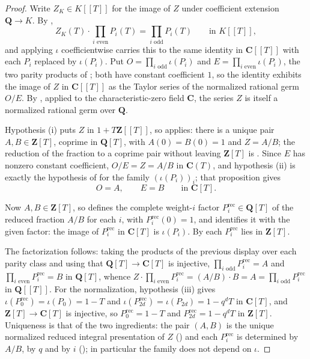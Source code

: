 \begin{proof}
\leanok
Write $Z_K\in K[[T]]$ for the image of $Z$ under coefficient extension
$\mathbf Q\to K$.  By ,
\[
  Z_K(T)\cdot\prod_{i\text{ even}}P_i(T)=\prod_{i\text{ odd}}P_i(T)
  \qquad\text{in }K[[T]],
\]
and applying $\iota$ coefficientwise carries this to the same identity in
$\mathbf C[[T]]$ with each $P_i$ replaced by $\iota(P_i)$.  Put
$O=\prod_{i\text{ odd}}\iota(P_i)$ and $E=\prod_{i\text{ even}}\iota(P_i)$,
the two parity products of ; both have constant
coefficient $1$, so the identity exhibits the image of $Z$ in
$\mathbf C[[T]]$ as the Taylor series of the normalized rational germ $O/E$.
By , applied to the
characteristic-zero field $\mathbf C$, the series $Z$ is itself a normalized
rational germ over $\mathbf Q$.

Hypothesis (i) puts $Z$ in $1+T\mathbf Z[[T]]$, so
 applies: there is a unique pair
$A,B\in\mathbf Z[T]$, coprime in $\mathbf Q[T]$, with
$A(0)=B(0)=1$ and $Z=A/B$; the reduction of the fraction to a coprime pair
without leaving $\mathbf Z[T]$ is
.  Since $E$ has nonzero constant
coefficient, $O/E=Z=A/B$ in $\mathbf C(T)$, and hypothesis (ii) is exactly the
hypothesis of  for the family
$(\iota(P_i))_i$; that proposition gives
\[
  O=A,\qquad E=B\qquad\text{in }\mathbf C[T].
\]

Now $A,B\in\mathbf Z[T]$, so  defines
the complete weight-$i$ factor $P_i^{\mathrm{rec}}\in\mathbf Q[T]$ of the
reduced fraction $A/B$ for each $i$, with
$P_i^{\mathrm{rec}}(0)=1$, and  identifies it
with the given factor: the image of $P_i^{\mathrm{rec}}$ in $\mathbf C[T]$ is
$\iota(P_i)$.  By
 each $P_i^{\mathrm{rec}}$ lies in
$\mathbf Z[T]$.

The factorization follows: taking the products of the previous display over
each parity class and using that $\mathbf Q[T]\to\mathbf C[T]$ is injective,
$\prod_{i\text{ odd}}P_i^{\mathrm{rec}}=A$ and
$\prod_{i\text{ even}}P_i^{\mathrm{rec}}=B$ in $\mathbf Q[T]$, whence
$Z\cdot\prod_{i\text{ even}}P_i^{\mathrm{rec}}
=(A/B)\cdot B=A=\prod_{i\text{ odd}}P_i^{\mathrm{rec}}$ in
$\mathbf Q[[T]]$.  For the normalization, hypothesis (iii) gives
$\iota(P_0^{\mathrm{rec}})=\iota(P_0)=1-T$ and
$\iota(P_{2d}^{\mathrm{rec}})=\iota(P_{2d})=1-q^dT$ in $\mathbf C[T]$, and
$\mathbf Z[T]\to\mathbf C[T]$ is injective, so
$P_0^{\mathrm{rec}}=1-T$ and $P_{2d}^{\mathrm{rec}}=1-q^dT$ in
$\mathbf Z[T]$.  Uniqueness is that of the two ingredients: the pair $(A,B)$
is the unique normalized reduced integral presentation of $Z$
() and each $P_i^{\mathrm{rec}}$ is determined
by $A/B$, by $q$ and by $i$ (); in particular
the family does not depend on $\iota$.
\end{proof}

